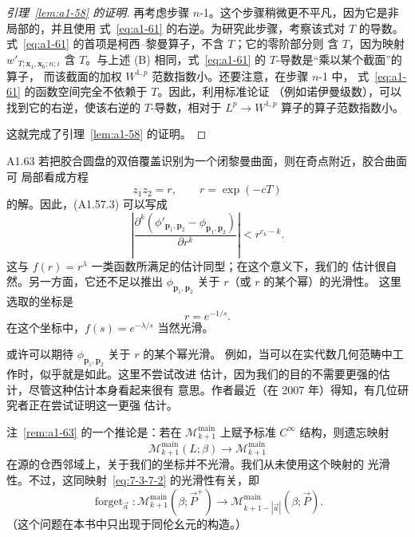 \begin{proof}[引理~\ref{lem:a1-58} 的证明]
再考虑步骤 $n$-1。这个步骤稍微更不平凡，因为它是非局部的，并且使用
式~\eqref{eq:a1-61} 的右逆。为研究此步骤，考察该式对 $T$ 的导数。
式~\eqref{eq:a1-61} 的首项是柯西--黎曼算子，不含 $T$；它的零阶部分则
含 $T$，因为映射 $w'_{T;\mathbf x_1,\mathbf x_0;n;i}$ 含 $T$。与上述
(B) 相同，式~\eqref{eq:a1-61} 的 $T$-导数是“乘以某个截面”的算子，
而该截面的加权 $W^{1,p}$ 范数指数小。还要注意，在步骤 $n$-1 中，
式~\eqref{eq:a1-61} 的函数空间完全不依赖于 $T$。因此，利用标准论证
（例如诺伊曼级数），可以找到它的右逆，使该右逆的 $T$-导数，相对于
$L^p\to W^{1,p}$ 算子的算子范数指数小。

这就完成了引理~\ref{lem:a1-58} 的证明。
\end{proof}

\begin{remark}{A1.63}\label{rem:a1-63}
若把胶合圆盘的双倍覆盖识别为一个闭黎曼曲面，则在奇点附近，胶合曲面可
局部看成方程
\[
 z_1z_2=r,
 \qquad r=\exp(-cT)
\]
的解。因此，(A1.57.3) 可以写成
\[
 \left\lvert
 \frac{\partial^k
  (\phi'_{\mathbf p_1,\mathbf p_2}
   -\phi_{\mathbf p_1,\mathbf p_2})}
 {\partial r^k}
 \right\rvert
 <r^{c_k-k}.
\]
这与 $f(r)=r^\lambda$ 一类函数所满足的估计同型；在这个意义下，我们的
估计很自然。另一方面，它还不足以推出
$\phi_{\mathbf p_1,\mathbf p_2}$ 关于 $r$（或 $r$ 的某个幂）的光滑性。
这里选取的坐标是
\[
 r=e^{-1/s}.
\]
在这个坐标中，$f(s)=e^{-\lambda/s}$ 当然光滑。

或许可以期待 $\phi_{\mathbf p_1,\mathbf p_2}$ 关于 $r$ 的某个幂光滑。
例如，当可以在实代数几何范畴中工作时，似乎就是如此。这里不尝试改进
估计，因为我们的目的不需要更强的估计，尽管这种估计本身看起来很有
意思。作者最近（在 2007 年）得知，有几位研究者正在尝试证明这一更强
估计。
\end{remark}

注~\ref{rem:a1-63} 的一个推论是：若在
$\mathcal M_{k+1}^{\mathrm{main}}$ 上赋予标准 $C^\infty$ 结构，则遗忘映射
\[
 \mathcal M_{k+1}^{\mathrm{main}}(L;\beta)
 \longrightarrow
 \mathcal M_{k+1}^{\mathrm{main}}
\]
在源的仓西邻域上，关于我们的坐标并不光滑。我们从未使用这个映射的
光滑性。不过，这同映射~\eqref{eq:7-3-7-2} 的光滑性有关，即
\[
 \operatorname{forget}_{\vec a}\colon
 \mathcal M_{k+1}^{\mathrm{main}}(\beta;\vec P^+)
 \longrightarrow
 \mathcal M_{k+1-|\vec a|}^{\mathrm{main}}(\beta;\vec P).
\]
（这个问题在本书中只出现于同伦幺元的构造。）

